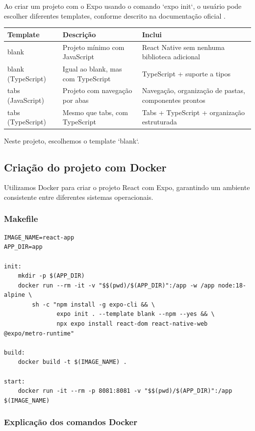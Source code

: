 Ao criar um projeto com o Expo usando o comando `expo init`, o usuário pode escolher diferentes templates, conforme descrito na documentação oficial \cite{expoCreateExpo}.

\begin{longtable}{|p{3.5cm}|p{3.5cm}|p{6.5cm}|}
\hline
\textbf{Template} & \textbf{Descrição} & \textbf{Inclui} \\
\hline
blank & Projeto mínimo com JavaScript & React Native sem nenhuma biblioteca adicional \\
\hline
blank (TypeScript) & Igual ao blank, mas com TypeScript & TypeScript + suporte a tipos \\
\hline
tabs (JavaScript) & Projeto com navegação por abas & Navegação, organização de pastas, componentes prontos \\
\hline
tabs (TypeScript) & Mesmo que tabs, com TypeScript & Tabs + TypeScript + organização estruturada \\
\hline
\end{longtable}

Neste projeto, escolhemos o template `blank`.

\subsection{Criação do projeto com Docker}

Utilizamos Docker para criar o projeto React com Expo, garantindo um ambiente consistente entre diferentes sistemas operacionais.

\subsubsection*{Makefile}

\begin{lstlisting}[caption={Comando Make para criar o projeto com Expo}]
IMAGE_NAME=react-app
APP_DIR=app

init:
	mkdir -p $(APP_DIR)
	docker run --rm -it -v "$$(pwd)/$(APP_DIR)":/app -w /app node:18-alpine \
		sh -c "npm install -g expo-cli && \
		       expo init . --template blank --npm --yes && \
		       npx expo install react-dom react-native-web @expo/metro-runtime"

build:
	docker build -t $(IMAGE_NAME) .

start:
	docker run -it --rm -p 8081:8081 -v "$$(pwd)/$(APP_DIR)":/app $(IMAGE_NAME)
\end{lstlisting}

\subsubsection*{Explicação dos comandos Docker}

